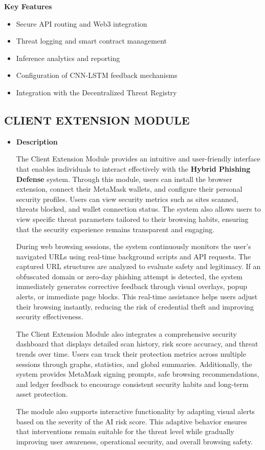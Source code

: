 \textbf{Key Features}

\begin{itemize}
\item Secure API routing and Web3 integration
\item Threat logging and smart contract management
\item Inference analytics and reporting
\item Configuration of CNN-LSTM feedback mechanisms
\item Integration with the Decentralized Threat Registry
\end{itemize}
\newpage

\subsection{CLIENT EXTENSION MODULE}

\begin{itemize}

\item \textbf{Description}

The Client Extension Module provides an intuitive and user-friendly interface that enables individuals to interact effectively with the \textbf{Hybrid Phishing Defense} system. Through this module, users can install the browser extension, connect their MetaMask wallets, and configure their personal security profiles. Users can view security metrics such as sites scanned, threats blocked, and wallet connection status. The system also allows users to view specific threat parameters tailored to their browsing habits, ensuring that the security experience remains transparent and engaging.

During web browsing sessions, the system continuously monitors the user’s navigated URLs using real-time background scripts and API requests. The captured URL structures are analyzed to evaluate safety and legitimacy. If an obfuscated domain or zero-day phishing attempt is detected, the system immediately generates corrective feedback through visual overlays, popup alerts, or immediate page blocks. This real-time assistance helps users adjust their browsing instantly, reducing the risk of credential theft and improving security effectiveness.

The Client Extension Module also integrates a comprehensive security dashboard that displays detailed scan history, risk score accuracy, and threat trends over time. Users can track their protection metrics across multiple sessions through graphs, statistics, and global summaries. Additionally, the system provides MetaMask signing prompts, safe browsing recommendations, and ledger feedback to encourage consistent security habits and long-term asset protection.

The module also supports interactive functionality by adapting visual alerts based on the severity of the AI risk score. This adaptive behavior ensures that interventions remain suitable for the threat level while gradually improving user awareness, operational security, and overall browsing safety.

\end{itemize}

